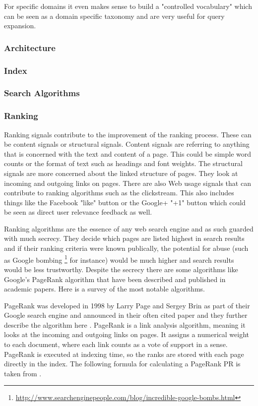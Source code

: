 For specific domains it even makes sense to build a "controlled vocabulary" which can be seen as a domain specific taxonomy and are very useful for query expansion.

\subsubsection{Architecture}
\subsubsection{Index}
\subsubsection{Search Algorithms}
\subsubsection{Ranking}

Ranking signals contribute to the improvement of the ranking process. These can be content signals or structural signals. Content signals are referring to anything that is concerned with the text and content of a page. This could be simple word counts or the format of text such as headings and font weights. The structural signals are more concerned about the linked structure of pages. They look at incoming and outgoing links on pages. There are also Web usage signals that can contribute to ranking algorithms such as the clickstream.  This also includes things like the Facebook "like" button or the Google+ "+1" button which could be seen as direct user relevance feedback as well.

Ranking algorithms are the essence of any web search engine and as such guarded with much secrecy. They decide which pages are listed highest in search results and if their ranking criteria were known publically, the potential for abuse (such as Google bombing \footnote{\url{http://www.searchenginepeople.com/blog/incredible-google-bombs.html}} for instance) would be much higher and search results would be less trustworthy. Despite the secrecy there are some algorithms like Google's PageRank algorithm that have been described and published in academic papers. Here is a survey of the most notable algorithms.

PageRank was developed in 1998 by Larry Page and Sergey Brin as part of their Google search engine and announced in their often cited paper \citep{Brin1998b} and they further describe the algorithm here \citep{Brin1998}. PageRank is a link analysis algorithm, meaning it looks at the incoming and outgoing links on pages. It assigns a numerical weight to each document, where each link counts as a vote of support in a sense. PageRank is executed at indexing time, so the ranks are stored with each page directly in the index. The following formula for calculating a PageRank PR is taken from \citep[p.472]{Baeza-Yates2011}.

